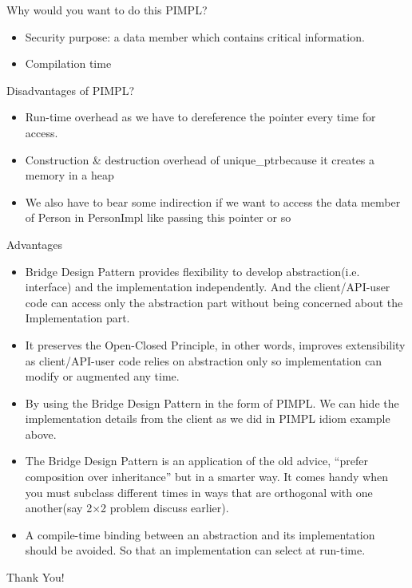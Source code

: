 \documentclass[13pt]{beamer}
\begin{document}
\begin{frame}{Why would you want to do this PIMPL?}
	\textcolor{blue}{}
	\begin{itemize}
		\setlength\itemsep{1em}
		\item Security purpose: a data member which contains critical information.
		\item Compilation time
	\end{itemize}
\end{frame}

\begin{frame}{Disadvantages of PIMPL?}
	\textcolor{blue}{}
	\begin{itemize}
		\setlength\itemsep{1em}
		\item Run-time overhead as we have to dereference the pointer every time for access.
		\item Construction \& destruction overhead of unique\_ptrbecause it creates a memory in a heap
		\item We also have to bear some indirection if we want to access the data member of Person in PersonImpl like passing this pointer or so
	\end{itemize}
\end{frame}

\begin{frame}{Advantages}
	\textcolor{blue}{}
	\begin{itemize}
		\item Bridge Design Pattern provides flexibility to develop abstraction(i.e. interface) and the implementation independently. And the client/API-user code can access only the abstraction part without being concerned about the Implementation part.
		\item It preserves the Open-Closed Principle, in other words, improves extensibility as client/API-user code relies on abstraction only so implementation can modify or augmented any time.
		\item By using the Bridge Design Pattern in the form of PIMPL. We can hide the implementation details from the client as we did in PIMPL idiom example above.
		\item The Bridge Design Pattern is an application of the old advice, “prefer composition over inheritance” but in a smarter way. It comes handy when you must subclass different times in ways that are orthogonal with one another(say 2×2 problem discuss earlier).
		\item A compile-time binding between an abstraction and its implementation should be avoided. So that an implementation can select at run-time.
	\end{itemize}
\end{frame}

\begin{frame}
\begin{center}
{\fontsize{40}{50}\selectfont Thank You!}
\end{center}
\end{frame}
\end{document}
